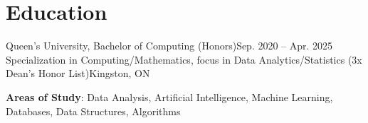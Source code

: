 \section{Education}
  \resumeSubHeadingListStart
    \resumeSubheading
      {Queen's University, Bachelor of Computing (Honors)}{Sep. 2020 -- Apr. 2025}
      {Specialization in Computing/Mathematics, focus in Data Analytics/Statistics (3x Dean's Honor List)}{Kingston, ON}
      \begin{itemize}[leftmargin=0.0in, label={}]
    \small{\item{
     \textbf{Areas of Study}{: Data Analysis, Artificial Intelligence, Machine Learning, Databases, Data Structures, Algorithms}
    }}
 \end{itemize}
  \resumeSubHeadingListEnd